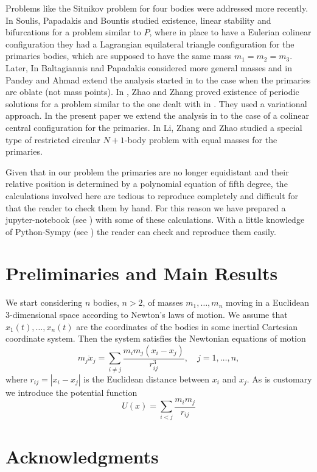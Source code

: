 \documentclass[twoside]{article}
\theoremstyle{remark}
\begin{document}
Problems like the Sitnikov problem for four bodies  were addressed more recently.
In \cite{soulis2008periodic} Soulis, Papadakis and Bountis studied existence, linear stability and bifurcations for a problem similar to $P$, where in place to have a Eulerian colinear configuration they had a Lagrangian equilateral triangle configuration for the primaries bodies, which are supposed to have the same mass $m_1=m_2=m_3$. Later, In \cite{baltagiannis2011families} Baltagiannis nad Papadakis considered more general masses and in \cite{pandey2013periodic} Pandey and Ahmad extend the analysis started in \cite{soulis2008periodic} to the case when the primaries are oblate (not mass points).
In \cite{zhao2015nonplanar}, Zhao and Zhang proved existence of periodic solutions for a problem similar to the one dealt with in \cite{soulis2008periodic}.  They used a variational approach. In the present paper we extend the analysis in \cite{zhao2015nonplanar} to the case of a colinear central configuration for the primaries.
In \cite{li2013characterization} Li, Zhang and Zhao studied a special type of
restricted circular $N+1$-body problem  with equal masses for the primaries. 

Given that in our problem the primaries are no longer equidistant and their relative position is determined by a polynomial equation of fifth degree, the calculations involved here are tedious to reproduce completely and difficult for that the reader to check them by hand. For this reason we have prepared a jupyter-notebook (see \cite{CalAux}) with some of these calculations. With a little knowledge of Python-Sympy (see \cite{sympy}) the reader can check and reproduce them easily.


\section{Preliminaries and Main Results}

We start considering $n$ bodies, $n>2$, of masses $m_1,\ldots,m_n$ moving in a Euclidean 3-dimensional space according to Newton's laws of motion. We assume that $x_1(t),\ldots,x_n(t)$ are the coordinates of the bodies in some inertial Cartesian coordinate system. Then the system satisfies the Newtonian equations of motion
\begin{equation}\label{eq:newton}
 m_j\ddot{x}_j=\sum_{i\neq j}\frac{m_im_j(x_i-x_j)}{r_{ij}^3},\quad j=1,\ldots,n,
\end{equation}
where $r_{ij}=|x_i-x_j|$ is the Euclidean distance between $x_i$ and $x_j$. As is customary we introduce the potential function
\begin{equation}\label{eq:potencial}
 U(x)=\sum_{i<j}\frac{m_im_j}{r_{ij}}
\end{equation}




\section*{Acknowledgments}




 
\end{document}
